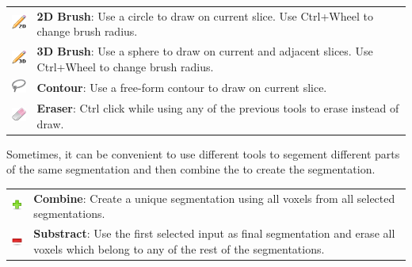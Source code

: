 \begin{tabular}{m{0.8cm} m{13cm}}
\includegraphics[width=0.7cm]{../../frontend/rsc/pencil2D} &
\textbf{2D Brush}: Use a circle to draw on current slice. Use Ctrl+Wheel to
change brush radius.\\

\includegraphics[width=0.7cm]{../../frontend/rsc/pencil3D} &
\textbf{3D Brush}: Use a sphere to draw on current and adjacent slices. Use
Ctrl+Wheel to change brush radius.\\

\includegraphics[width=0.7cm]{../../frontend/rsc/lasso} &
\textbf{Contour}: Use a free-form contour to draw on current slice.\\

\includegraphics[width=0.7cm]{../../frontend/rsc/eraser} &
\textbf{Eraser}: Ctrl click while using any of the previous tools to erase
instead of draw.
\end{tabular}

Sometimes, it can be convenient to use different tools to segement different
parts of the same segmentation and then combine the to create the segmentation.

\begin{tabular}{m{0.8cm} m{13cm}}
\includegraphics[width=0.7cm]{../../frontend/rsc/add} &
\textbf{Combine}: Create a unique segmentation using all voxels from all
selected segmentations.\\

\includegraphics[width=0.7cm]{../../frontend/rsc/remove} &
\textbf{Substract}: Use the first selected input as final segmentation and erase
all voxels which belong to any of the rest of the segmentations.
\end{tabular}

